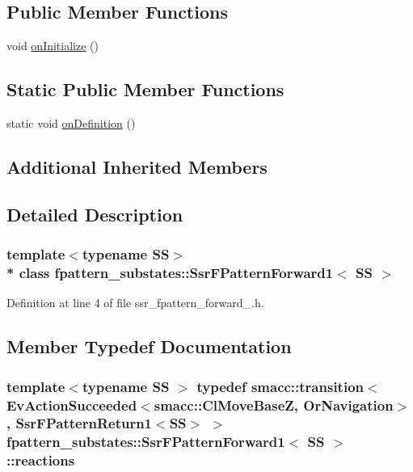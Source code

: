 \subsection*{Public Member Functions}
\begin{DoxyCompactItemize}
\item 
void \hyperlink{structfpattern__substates_1_1SsrFPatternForward1_a0e77a0cfda5eb78c46194942528aa3d6}{on\+Initialize} ()
\end{DoxyCompactItemize}
\subsection*{Static Public Member Functions}
\begin{DoxyCompactItemize}
\item 
static void \hyperlink{structfpattern__substates_1_1SsrFPatternForward1_a2da7d74b298449089088a15736520b6a}{on\+Definition} ()
\end{DoxyCompactItemize}
\subsection*{Additional Inherited Members}


\subsection{Detailed Description}
\subsubsection*{template$<$typename SS$>$\\*
class fpattern\+\_\+substates\+::\+Ssr\+F\+Pattern\+Forward1$<$ S\+S $>$}



Definition at line 4 of file ssr\+\_\+fpattern\+\_\+forward\+\_.\+h.



\subsection{Member Typedef Documentation}
\subsubsection[{\texorpdfstring{reactions}{reactions}}]{\setlength{\rightskip}{0pt plus 5cm}template$<$typename SS $>$ typedef {\bf smacc\+::transition}$<$Ev\+Action\+Succeeded$<${\bf smacc\+::\+Cl\+Move\+BaseZ}, Or\+Navigation$>$, {\bf Ssr\+F\+Pattern\+Return1}$<$SS$>$ $>$ {\bf fpattern\+\_\+substates\+::\+Ssr\+F\+Pattern\+Forward1}$<$ SS $>$\+::{\bf reactions}}\hypertarget{structfpattern__substates_1_1SsrFPatternForward1_a7ac0fadfa295c4f4e3539002d3c41b80}{}\label{structfpattern__substates_1_1SsrFPatternForward1_a7ac0fadfa295c4f4e3539002d3c41b80}


